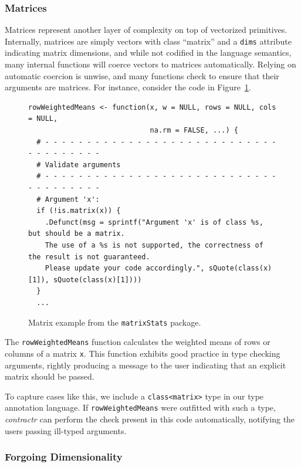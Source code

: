 \documentclass[acmsmall,review,anonymous]{acmart}\settopmatter{printfolios=true,printccs=false,printacmref=false}
\newcommand{\code}[1]{{\lstinline[style=Rin]!#1!}\xspace}
\newcommand{\contractr}{\emph{contractr}\xspace} %
\begin{document}
%
%
\subsubsection{Matrices}

Matrices represent another layer of complexity on top of vectorized primitives.
Internally, matrices are simply vectors with class ``matrix'' and a \code{dims} attribute indicating matrix dimensions, and while not codified in the language semantics, many internal functions will coerce vectors to matrices automatically.
Relying on automatic coercion is unwise, and many functions check to ensure that their arguments are matrices.
For instance, consider the code in Figure~\ref{fig:matrix-example}.

\begin{figure}[htbp]
\begin{center}

\begin{lstlisting}
rowWeightedMeans <- function(x, w = NULL, rows = NULL, cols = NULL,
                             na.rm = FALSE, ...) {
  # - - - - - - - - - - - - - - - - - - - - - - - - - - - - - - - - - - - - -
  # Validate arguments
  # - - - - - - - - - - - - - - - - - - - - - - - - - - - - - - - - - - - - -
  # Argument 'x':
  if (!is.matrix(x)) {
    .Defunct(msg = sprintf("Argument 'x' is of class %s, but should be a matrix. 
    The use of a %s is not supported, the correctness of the result is not guaranteed. 
    Please update your code accordingly.", sQuote(class(x)[1]), sQuote(class(x)[1])))
  }
  ...
\end{lstlisting}

\caption{Matrix example from the \code{matrixStats} package.}
\label{fig:matrix-example}
\end{center}
\end{figure}

The \code{rowWeightedMeans} function calculates the weighted means of rows or columns of a matrix \code{x}.
This function exhibits good practice in type checking arguments, rightly producing a message to the user indicating that an explicit matrix should be passed.

To capture cases like this, we include a \code{class<matrix>} type in our type annotation language.
If \code{rowWeightedMeans} were outfitted with such a type, \contractr can perform the check present in this code automatically, notifying the users passing ill-typed arguments.

%
%
\subsubsection{Forgoing Dimensionality} 
\end{document}
